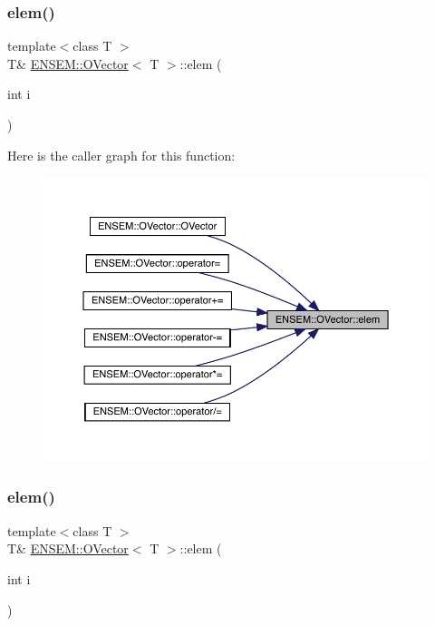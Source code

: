 \subsubsection{\texorpdfstring{elem()}{elem()}\hspace{0.1cm}{\footnotesize\ttfamily [1/4]}}
{\footnotesize\ttfamily template$<$class T $>$ \\
T\& \mbox{\hyperlink{classENSEM_1_1OVector}{E\+N\+S\+E\+M\+::\+O\+Vector}}$<$ T $>$\+::elem (\begin{DoxyParamCaption}\item[{int}]{i }\end{DoxyParamCaption})\hspace{0.3cm}{\ttfamily [inline]}}

Here is the caller graph for this function\+:\nopagebreak
\begin{figure}[H]
\begin{center}
\leavevmode
\includegraphics[width=350pt]{d0/d8d/classENSEM_1_1OVector_a8d84b5c1145d0647107413d254450417_icgraph}
\end{center}
\end{figure}
\mbox{\label{classENSEM_1_1OVector_a8d84b5c1145d0647107413d254450417}} 
\subsubsection{\texorpdfstring{elem()}{elem()}\hspace{0.1cm}{\footnotesize\ttfamily [2/4]}}
{\footnotesize\ttfamily template$<$class T $>$ \\
T\& \mbox{\hyperlink{classENSEM_1_1OVector}{E\+N\+S\+E\+M\+::\+O\+Vector}}$<$ T $>$\+::elem (\begin{DoxyParamCaption}\item[{int}]{i }\end{DoxyParamCaption})\hspace{0.3cm}{\ttfamily [inline]}}

